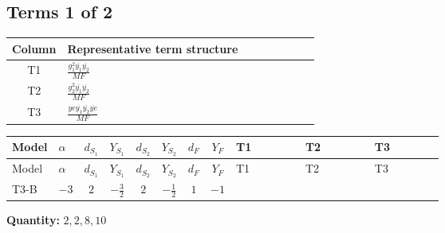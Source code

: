 \documentclass[8pt]{article}
\begin{document}
\begin{landscape}
\subsection*{Terms 1 of 2}
\begin{center}
\begin{tabular}{@{}c >{\raggedright\arraybackslash}p{0.82\linewidth}@{}}
\toprule
Column & Representative term structure \\
\midrule
T1 & \(\displaystyle \frac{g_{1}^{2} \overline{y_{1}} \overline{y_{2}}}{MF}\) \\
\midrule
T2 & \(\displaystyle \frac{g_{2}^{2} \overline{y_{1}} \overline{y_{2}}}{MF}\) \\
\midrule
T3 & \(\displaystyle \frac{ye \overline{y_{1}} \overline{y_{2}} \overline{ye}}{MF}\) \\
\midrule
\bottomrule
\end{tabular}
\end{center}
\smallskip
\tiny
\begin{longtable}{@{}llcccccc >{\raggedright\arraybackslash}p{0.21\linewidth} >{\raggedright\arraybackslash}p{0.21\linewidth} >{\raggedright\arraybackslash}p{0.21\linewidth}@{}}
\toprule
Model & $\alpha$ & $d_{S_1}$ & $Y_{S_1}$ & $d_{S_2}$ & $Y_{S_2}$ & $d_F$ & $Y_F$ & T1 & T2 & T3 \\
\midrule
\endfirsthead
\toprule
Model & $\alpha$ & $d_{S_1}$ & $Y_{S_1}$ & $d_{S_2}$ & $Y_{S_2}$ & $d_F$ & $Y_F$ & T1 & T2 & T3 \\
\midrule
\endhead
T3-B & $-3$ & $2$ & $-\frac{3}{2}$ & $2$ & $-\frac{1}{2}$ & $1$ & $-1$ & \scriptsize\adjustbox{max width=\linewidth}{$\begin{gathered} \frac{3 g_{1}^{2} \overline{y_{1}} \overline{y_{2}}}{2 MF}\end{gathered}$} & \scriptsize\adjustbox{max width=\linewidth}{$\begin{gathered} \frac{3 g_{2}^{2} \overline{y_{1}} \overline{y_{2}}}{4 MF}\end{gathered}$} & \scriptsize\adjustbox{max width=\linewidth}{$\begin{gathered} - \frac{ye \overline{y_{1}} \overline{y_{2}} \overline{ye}}{4 MF}\end{gathered}$} \\
\midrule
\bottomrule
\end{longtable}
\clearpage
\noindent\textbf{Quantity: }$\mathrm{2,2,8,10}$\par\smallskip

\end{landscape}
\end{document}
